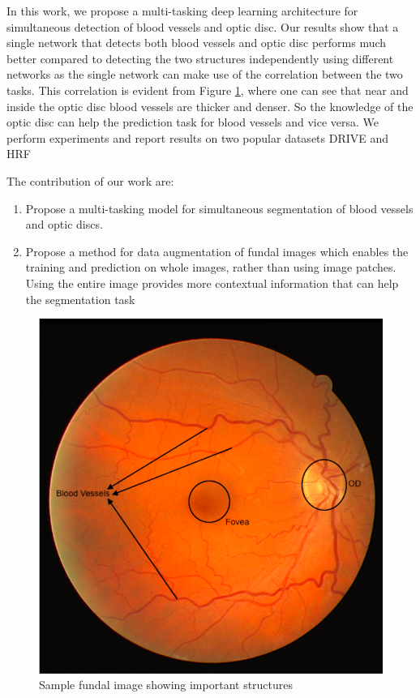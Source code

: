 In this work, we propose a multi-tasking deep learning architecture for simultaneous detection of blood vessels and optic disc.
Our results show that a single network that detects both blood vessels and optic disc performs much better compared to detecting the two structures independently using different networks as the single network can make use of the correlation between the two tasks.
This correlation is evident from Figure \ref{sample_funal_image}, where one can see that near and inside the optic disc blood vessels are thicker and denser.
So the knowledge of the optic disc can help the prediction task for blood vessels and vice versa.
We perform experiments and report results on two popular datasets DRIVE \cite{drive} and HRF \cite{budai2013robust}

The contribution of our work are:
\begin{enumerate}
  \item Propose a multi-tasking model for simultaneous segmentation of blood vessels and optic discs.
  \item Propose a method for data augmentation of fundal images which enables the training and prediction on whole images, rather than using image patches.
  Using the entire image provides more contextual information that can help the segmentation task
\end{enumerate}

\begin{figure}[!ht]
  \centering
  \includegraphics[width=\linewidth]{images/eye.png}
  \caption{Sample fundal image showing important structures}
  \label{sample_funal_image}
\end{figure}

